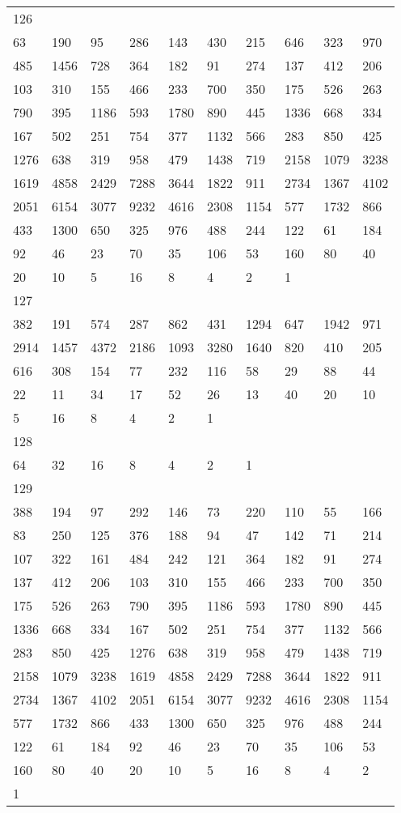 \begin{longtable}{*{10}{l}}
126&&&&&&&&&\\
63& 190& 95& 286& 143& 430& 215& 646& 323& 970\\
485& 1456& 728& 364& 182& 91& 274& 137& 412& 206\\
103& 310& 155& 466& 233& 700& 350& 175& 526& 263\\
790& 395& 1186& 593& 1780& 890& 445& 1336& 668& 334\\
167& 502& 251& 754& 377& 1132& 566& 283& 850& 425\\
1276& 638& 319& 958& 479& 1438& 719& 2158& 1079& 3238\\
1619& 4858& 2429& 7288& 3644& 1822& 911& 2734& 1367& 4102\\
2051& 6154& 3077& 9232& 4616& 2308& 1154& 577& 1732& 866\\
433& 1300& 650& 325& 976& 488& 244& 122& 61& 184\\
92& 46& 23& 70& 35& 106& 53& 160& 80& 40\\
20& 10& 5& 16& 8& 4& 2& 1& \\

127&&&&&&&&&\\
382& 191& 574& 287& 862& 431& 1294& 647& 1942& 971\\
2914& 1457& 4372& 2186& 1093& 3280& 1640& 820& 410& 205\\
616& 308& 154& 77& 232& 116& 58& 29& 88& 44\\
22& 11& 34& 17& 52& 26& 13& 40& 20& 10\\
5& 16& 8& 4& 2& 1& \\

128&&&&&&&&&\\
64& 32& 16& 8& 4& 2& 1& \\

129&&&&&&&&&\\
388& 194& 97& 292& 146& 73& 220& 110& 55& 166\\
83& 250& 125& 376& 188& 94& 47& 142& 71& 214\\
107& 322& 161& 484& 242& 121& 364& 182& 91& 274\\
137& 412& 206& 103& 310& 155& 466& 233& 700& 350\\
175& 526& 263& 790& 395& 1186& 593& 1780& 890& 445\\
1336& 668& 334& 167& 502& 251& 754& 377& 1132& 566\\
283& 850& 425& 1276& 638& 319& 958& 479& 1438& 719\\
2158& 1079& 3238& 1619& 4858& 2429& 7288& 3644& 1822& 911\\
2734& 1367& 4102& 2051& 6154& 3077& 9232& 4616& 2308& 1154\\
577& 1732& 866& 433& 1300& 650& 325& 976& 488& 244\\
122& 61& 184& 92& 46& 23& 70& 35& 106& 53\\
160& 80& 40& 20& 10& 5& 16& 8& 4& 2\\
1& \\


\end{longtable}
